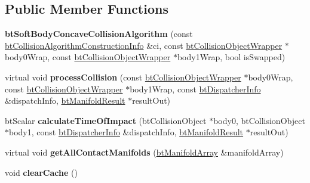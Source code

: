 \subsection*{Public Member Functions}
\begin{DoxyCompactItemize}
\item 
\hypertarget{classbt_soft_body_concave_collision_algorithm_a900d1d275efdad02fc6b745f228809fe}{{\bfseries bt\+Soft\+Body\+Concave\+Collision\+Algorithm} (const \hyperlink{structbt_collision_algorithm_construction_info}{bt\+Collision\+Algorithm\+Construction\+Info} \&ci, const \hyperlink{structbt_collision_object_wrapper}{bt\+Collision\+Object\+Wrapper} $\ast$body0\+Wrap, const \hyperlink{structbt_collision_object_wrapper}{bt\+Collision\+Object\+Wrapper} $\ast$body1\+Wrap, bool is\+Swapped)}\label{classbt_soft_body_concave_collision_algorithm_a900d1d275efdad02fc6b745f228809fe}

\item 
\hypertarget{classbt_soft_body_concave_collision_algorithm_a3d8cac51dc97009aa5ec20089d8bca8b}{virtual void {\bfseries process\+Collision} (const \hyperlink{structbt_collision_object_wrapper}{bt\+Collision\+Object\+Wrapper} $\ast$body0\+Wrap, const \hyperlink{structbt_collision_object_wrapper}{bt\+Collision\+Object\+Wrapper} $\ast$body1\+Wrap, const \hyperlink{structbt_dispatcher_info}{bt\+Dispatcher\+Info} \&dispatch\+Info, \hyperlink{classbt_manifold_result}{bt\+Manifold\+Result} $\ast$result\+Out)}\label{classbt_soft_body_concave_collision_algorithm_a3d8cac51dc97009aa5ec20089d8bca8b}

\item 
\hypertarget{classbt_soft_body_concave_collision_algorithm_ab87e28ad2421521ef7ea031c5362050f}{bt\+Scalar {\bfseries calculate\+Time\+Of\+Impact} (bt\+Collision\+Object $\ast$body0, bt\+Collision\+Object $\ast$body1, const \hyperlink{structbt_dispatcher_info}{bt\+Dispatcher\+Info} \&dispatch\+Info, \hyperlink{classbt_manifold_result}{bt\+Manifold\+Result} $\ast$result\+Out)}\label{classbt_soft_body_concave_collision_algorithm_ab87e28ad2421521ef7ea031c5362050f}

\item 
\hypertarget{classbt_soft_body_concave_collision_algorithm_a94cd631f80c90cff9e1ff922bb3bac40}{virtual void {\bfseries get\+All\+Contact\+Manifolds} (\hyperlink{classbt_aligned_object_array}{bt\+Manifold\+Array} \&manifold\+Array)}\label{classbt_soft_body_concave_collision_algorithm_a94cd631f80c90cff9e1ff922bb3bac40}

\item 
\hypertarget{classbt_soft_body_concave_collision_algorithm_a2b105422795e7fafaadd705d6e08a9d4}{void {\bfseries clear\+Cache} ()}\label{classbt_soft_body_concave_collision_algorithm_a2b105422795e7fafaadd705d6e08a9d4}

\end{DoxyCompactItemize}
